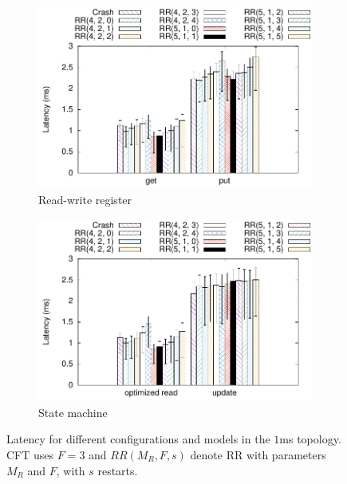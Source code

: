 \begin{figure}[t]
    \centering
    \begin{subfigure}[t]{.49 * 10cm}
        \includegraphics[width=\linewidth]{teem_results/protocol/1ms/parameter/reg_parameter}
        \caption{Read-write register}\label{fig:1ms_reg_lat_conf}
    \end{subfigure}
    \begin{subfigure}[t]{.49 * 10cm}
        \includegraphics[width=\linewidth]{teem_results/protocol/1ms/parameter/smr_parameter}
        \caption{State machine}\label{fig:1ms_smr_lat_conf}
    \end{subfigure}
    \caption{Latency for
    different configurations and models in the $1$ms topology. \ac{CFT} uses
    $F=3$ and
    $RR(M_R, F, s)$ denote \ac{RR} with parameters $M_R$ and
    $F$, with $s$ restarts.}
\end{figure}\label{fig:protocol_parameter_lat}


